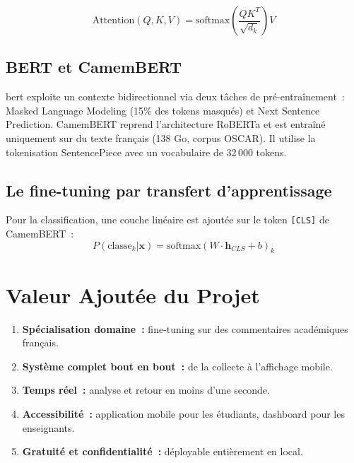 \documentclass[12pt,a4paper,oneside]{report}
\begin{document}
\begin{equation}
\text{Attention}(Q,K,V) = \text{softmax}\!\left(\frac{QK^T}{\sqrt{d_k}}\right)V
\label{eq:attention}
\end{equation}

\subsection{BERT et CamemBERT}

\acrfull{bert} \cite{devlin2019bert} exploite un contexte bidirectionnel via
deux tâches de pré-entraînement~: Masked Language Modeling (15\% des tokens
masqués) et Next Sentence Prediction. CamemBERT \cite{martin2020camembert}
reprend l'architecture RoBERTa \cite{liu2019roberta} et est entraîné
uniquement sur du texte français (138 Go, corpus OSCAR). Il utilise la
tokenisation SentencePiece \cite{kudo2018sentencepiece} avec un vocabulaire
de 32\,000 tokens.

\subsection{Le fine-tuning par transfert d'apprentissage}

Pour la classification, une couche linéaire est ajoutée sur le token
\texttt{[CLS]} de CamemBERT~:
\begin{equation}
P(\text{classe}_k|\mathbf{x}) = \text{softmax}(W\cdot\mathbf{h}_{CLS}+b)_k
\label{eq:classification}
\end{equation}

\section{Valeur Ajoutée du Projet}

\begin{definitionbox}
\begin{enumerate}
  \item \textbf{Spécialisation domaine~:} fine-tuning sur des commentaires
        académiques français.
  \item \textbf{Système complet bout en bout~:} de la collecte à l'affichage
        mobile.
  \item \textbf{Temps réel~:} analyse et retour en moins d'une seconde.
  \item \textbf{Accessibilité~:} application mobile pour les étudiants,
        dashboard pour les enseignants.
  \item \textbf{Gratuité et confidentialité~:} déployable entièrement en local.
\end{enumerate}
\end{definitionbox}
\end{document}
